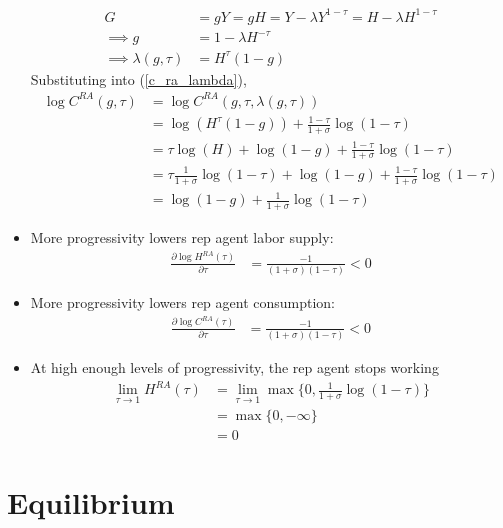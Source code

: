 \documentclass{article}
\begin{document}
\begin{itemize}
\begin{align*}
G &= gY = gH = Y - \lambda Y^{1-\tau} = H - \lambda H^{1-\tau} \\
\implies
g &= 1 - \lambda H^{-\tau}\\
\implies
\lambda(g, \tau)  &= H^{\tau}(1 - g)
\end{align*}
Substituting into (\ref{c_ra_lambda}),
\begin{align*}
\log C^{RA}(g, \tau) 
&= 
\log C^{RA}(g, \tau, \lambda(g, \tau)) \\
&= \log (H^{\tau}(1 - g)) +  \frac{1-\tau}{1 + \sigma} \log ( 1 - \tau) \\
&=\tau \log (H) + \log (1 - g) +  \frac{1-\tau}{1 + \sigma} \log ( 1 - \tau) \\
&=\tau \frac{1}{1 + \sigma} \log (1 - \tau) + \log (1 - g) +  \frac{1-\tau}{1 + \sigma} \log ( 1 - \tau) \\
&= \log (1 - g) +  \frac{1}{1 + \sigma} \log ( 1 - \tau)
\end{align*}
\item More progressivity lowers rep agent labor supply:
\begin{align*}
\frac{\partial \log H^{RA}(\tau)}{\partial \tau} &= \frac{-1}{(1 + \sigma)(1 - \tau)} < 0
\end{align*}
\item More progressivity lowers rep agent consumption:
\begin{align*}
\frac{\partial \log C^{RA}(\tau)}{\partial \tau} &=  \frac{-1}{(1 + \sigma)( 1 - \tau)} < 0
\end{align*}
\item At high enough levels of progressivity, the rep agent stops working
\begin{align*}
\lim_{\tau \to 1} H^{RA} (\tau) 
&= \lim_{\tau \to 1} \max\{0, \frac{1}{1 + \sigma} \log ( 1 - \tau)\}\\
&= \max\{0, -\infty\}\\
&= 0
\end{align*}
\end{itemize}




\section{Equilibrium}
\end{document}
